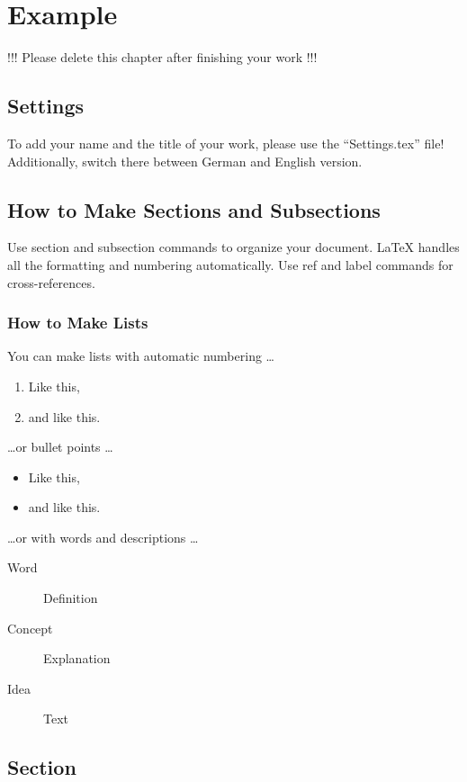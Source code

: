 \chapter{Example}
\label{ch:example}

!!! Please delete this chapter after finishing your work !!!

\section{Settings}

To add your name and the title of your work, please use the ``Settings.tex'' file!
Additionally, switch there between German and English version.

\section{How to Make Sections and Subsections}

Use section and subsection commands to organize your document. \LaTeX{} handles all the formatting and numbering automatically. Use ref and label commands for cross-references.

\subsection{How to Make Lists}

You can make lists with automatic numbering \dots

\begin{enumerate}
\item Like this,
\item and like this.
\end{enumerate}
\dots or bullet points \dots
\begin{itemize}
\item Like this,
\item and like this.
\end{itemize}
\dots or with words and descriptions \dots
\begin{description}
\item[Word] Definition
\item[Concept] Explanation
\item[Idea] Text
\end{description}

\section{Section}

